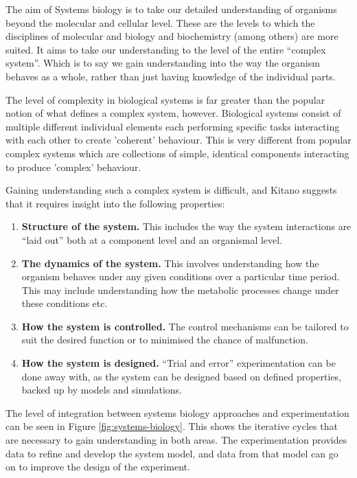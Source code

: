 The aim of Systems biology is to take our detailed understanding of organisms beyond the molecular and cellular level. These are the levels to which the disciplines of molecular and biology and biochemistry (among others) are more suited. It aims to take our understanding to the level of the entire ``complex system''. Which is to say we gain understanding into the way the organism behaves as a whole, rather than just having knowledge of the individual parts.

The level of complexity in biological systems is far greater than the popular notion of what defines a complex system, however. Biological systems consist of multiple different individual elements each performing specific tasks interacting with each other to create 'coherent' behaviour. This is very different from popular complex systems which are collections of simple, identical components interacting to produce 'complex' behaviour\cite{Kitano2002}.

Gaining understanding such a complex system is difficult, and Kitano suggests that it requires insight into the following properties\cite{Kitano2002a}:
\begin{enumerate}
 \item {\bf Structure of the system.} This includes the way the system interactions are ``laid out'' both at a component level and an organismal level.
 \item {\bf The dynamics of the system.} This involves understanding how the organism behaves under any given conditions over a particular time period. This may include understanding how the metabolic processes change under these conditions etc.
 \item {\bf How the system is controlled.} The control mechanisms can be tailored to suit the desired function or to minimised the chance of malfunction.
 \item {\bf How the system is designed.} ``Trial and error'' experimentation can be done away with, as the system can be designed based on defined properties, backed up by models and simulations.
\end{enumerate}

The level of integration between systems biology approaches and experimentation can be seen in Figure \ref{fig:systems-biology}. This shows the iterative cycles that are necessary to gain understanding in both areas. The experimentation provides data to refine and develop the system model, and data from that model can go on to improve the design of the experiment.

